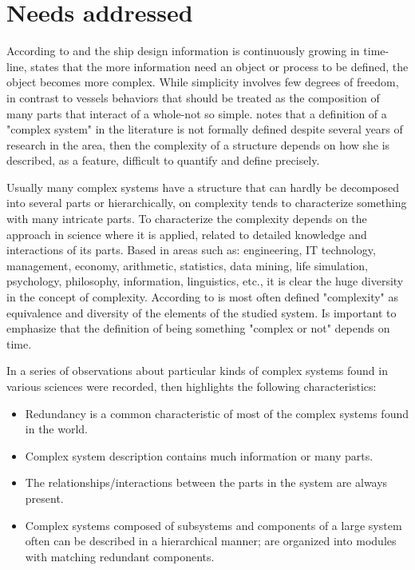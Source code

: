 \section{Needs addressed}


According to \cite{Gaspar12} and \cite{GasparNTNU13} the ship design information is continuously growing in time-line, \cite{Kolmogorov83} states that the more information need an object or process to be defined, the object becomes more complex. While simplicity involves few degrees of freedom, in contrast to vessels behaviors that should be treated as the composition of many parts that interact  of a whole-not so simple. \cite{Alexiou10} notes that a definition of a "complex system" in the literature is not formally defined despite several years of research in the area, then the complexity of a structure depends on how she is described, as a feature, difficult to quantify and define precisely.


Usually many complex systems have a structure that can hardly be decomposed into several parts or hierarchically, on  \cite{Simon62} complexity tends to characterize something with many intricate parts. To characterize the complexity depends on the approach in science where it is applied, related to detailed knowledge and interactions of its parts.  Based in areas such as: engineering, IT technology, management, economy, arithmetic, statistics, data mining, life simulation, psychology, philosophy, information, linguistics, etc., it is clear the huge diversity in the concept of complexity. According to \cite{Bonchev05} is most often defined "complexity" as equivalence and diversity of the elements of the studied system. Is important to emphasize that the definition of being something "complex or not" depends on time.


In \cite{Simon96} a series of observations about particular kinds of complex systems  found in various sciences were recorded, then highlights the following characteristics:


\begin{itemize}
\item Redundancy is a common characteristic of most of the complex systems found in the world.
\item Complex system description contains much information or many parts.
\item The relationships/interactions between the parts in the system are always present.
\item Complex systems composed of subsystems and components of a large system often can be described in a hierarchical manner; are organized into modules with matching redundant components.
\end{itemize}


